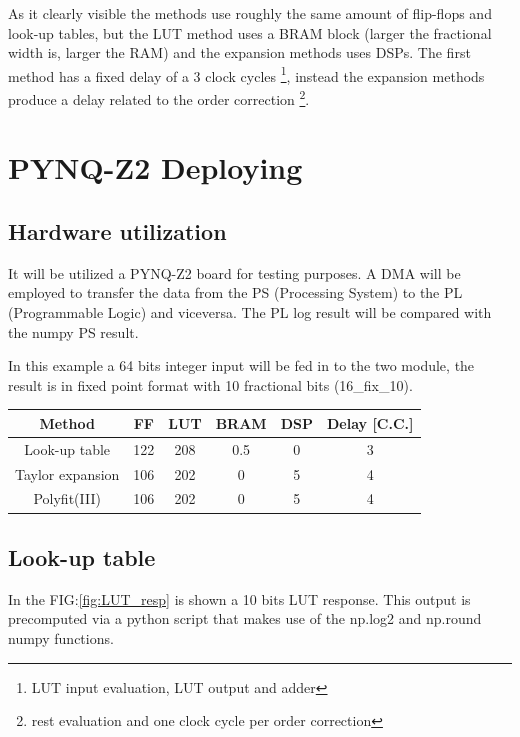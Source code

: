 \documentclass[12pt]{article}
\begin{document}
As it clearly visible the methods use roughly the same amount of flip-flops and look-up tables, but the LUT method uses a BRAM block (larger the fractional width is, larger the RAM) and the expansion methods uses DSPs.  
The first method has a fixed delay of a 3 clock cycles \footnote{LUT input evaluation, LUT output and adder}, instead the expansion methods produce a delay related to the order correction \footnote{rest evaluation and one clock cycle per order correction}.


\section{PYNQ-Z2 Deploying}

\subsection{Hardware utilization}
It will be utilized a PYNQ-Z2 board for testing purposes. A DMA will be employed to transfer the data from the PS (Processing System) to the PL (Programmable Logic) and viceversa. The PL log result will be compared with the numpy PS result.  

In this example a 64 bits integer input will be fed in to the two module, the result is in fixed point format with 10 fractional bits (16\_fix\_10).


\begin{table}[h]
\begin{tabular}{c|ccccc}
Method           & FF  & LUT & BRAM & DSP & Delay [C.C.] \\ \hline
Look-up table    & 122 & 208 & 0.5  & 0   & 3 \\
Taylor expansion & 106 & 202 & 0    & 5   & 4 \\
Polyfit(III)     & 106 & 202 & 0    & 5   & 4 \\

\end{tabular}
\end{table}

\subsection{Look-up table}

In the FIG:\ref{fig:LUT_resp} is shown a 10 bits LUT response. This output is precomputed via a python script that makes use of the np.log2 and np.round numpy functions. 
\end{document}
